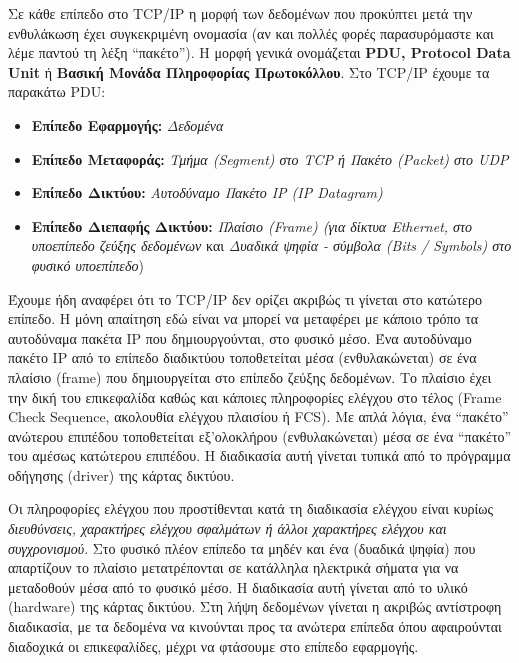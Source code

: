 Σε κάθε επίπεδο στο TCP/IP η μορφή των δεδομένων που προκύπτει μετά την ενθυλάκωση έχει συγκεκριμένη ονομασία (αν και πολλές φορές παρασυρόμαστε και λέμε παντού τη λέξη ``πακέτο''). Η μορφή γενικά ονομάζεται \textbf{PDU, Protocol Data Unit} ή \textbf{Βασική Μονάδα Πληροφορίας Πρωτοκόλλου}. Στο TCP/IP έχουμε τα παρακάτω PDU:

\begin{itemize}
\item \textbf{Επίπεδο Εφαρμογής:} \emph{Δεδομένα}
\item \textbf{Επίπεδο Μεταφοράς:} \emph{Τμήμα (Segment) στο TCP ή Πακέτο (Packet) στο UDP}
\item \textbf{Επίπεδο Δικτύου:} \emph{Αυτοδύναμο Πακέτο IP (IP Datagram)}
\item \textbf{Επίπεδο Διεπαφής Δικτύου:} \emph{Πλαίσιο (Frame) (για δίκτυα Ethernet, στο υποεπίπεδο ζεύξης δεδομένων} και \emph{Δυαδικά ψηφία - σύμβολα (Bits / Symbols) στο φυσικό υποεπίπεδο})
\end{itemize}

Έχουμε ήδη αναφέρει ότι το TCP/IP δεν ορίζει ακριβώς τι γίνεται στο κατώτερο επίπεδο. Η μόνη απαίτηση εδώ είναι να μπορεί να μεταφέρει με κάποιο τρόπο τα αυτοδύναμα πακέτα IP που δημιουργούνται, στο φυσικό μέσο. Ένα αυτοδύναμο πακέτο IP από το επίπεδο διαδικτύου τοποθετείται μέσα (ενθυλακώνεται) σε ένα πλαίσιο (frame) που δημιουργείται στο επίπεδο ζεύξης δεδομένων. Το πλαίσιο έχει την δική του επικεφαλίδα καθώς και κάποιες πληροφορίες ελέγχου στο τέλος (Frame Check Sequence, ακολουθία ελέγχου πλαισίου ή FCS). Με απλά λόγια, ένα ``πακέτο'' ανώτερου επιπέδου τοποθετείται εξ'ολοκλήρου (ενθυλακώνεται) μέσα σε ένα ``πακέτο'' του αμέσως κατώτερου επιπέδου. Η διαδικασία αυτή γίνεται τυπικά από το πρόγραμμα οδήγησης (driver) της κάρτας δικτύου.

Οι πληροφορίες ελέγχου που προστίθενται κατά τη διαδικασία ελέγχου είναι κυρίως \emph{διευθύνσεις, χαρακτήρες ελέγχου σφαλμάτων ή άλλοι χαρακτήρες ελέγχου και συγχρονισμού}. Στο φυσικό πλέον επίπεδο τα μηδέν και ένα (δυαδικά ψηφία) που απαρτίζουν το πλαίσιο μετατρέπονται σε κατάλληλα ηλεκτρικά σήματα για να μεταδοθούν μέσα από το φυσικό μέσο. Η διαδικασία αυτή γίνεται από το υλικό (hardware) της κάρτας δικτύου. Στη λήψη δεδομένων γίνεται η ακριβώς αντίστροφη διαδικασία, με τα δεδομένα να κινούνται προς τα ανώτερα επίπεδα όπου αφαιρούνται διαδοχικά οι επικεφαλίδες, μέχρι να φτάσουμε στο επίπεδο εφαρμογής.